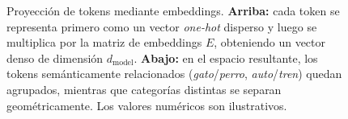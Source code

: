 \begin{figure}[H]

\caption{Proyección de tokens mediante embeddings. \textbf{Arriba:} cada token
se representa primero como un vector \textit{one-hot} disperso y luego se
multiplica por la matriz de embeddings $E$, obteniendo un vector denso de
dimensión $d_{\text{model}}$. \textbf{Abajo:} en el espacio resultante, los
tokens semánticamente relacionados (\textit{gato}/\textit{perro},
\textit{auto}/\textit{tren}) quedan agrupados, mientras que categorías
distintas se separan geométricamente. Los valores numéricos son ilustrativos.}
\label{fig:proyeccion_embedding}
\end{figure}
